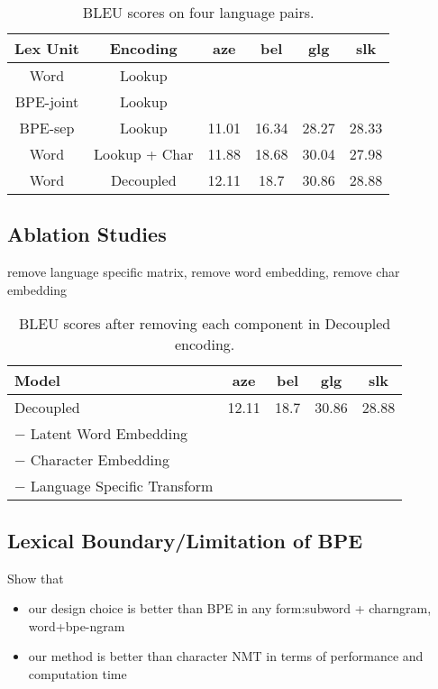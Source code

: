 \begin{table}[h]
    \centering
    \begin{tabular}{cc|cccc}
    Lex Unit & Encoding & aze & bel & glg & slk \\
    \midrule
    Word & Lookup & & & & \\
    BPE-joint & Lookup & & & & \\
    BPE-sep & Lookup & 11.01 & 16.34 & 28.27 & 28.33 \\
    \midrule
    Word & Lookup + Char & 11.88 & 18.68 & 30.04 & 27.98 \\
    Word & Decoupled & 12.11 & 18.7 & 30.86 & 28.88 \\
    \end{tabular}
    \caption{BLEU scores on four language pairs.}
    \label{tab:results}
\end{table}

\subsection{Ablation Studies}
remove language specific matrix, remove word embedding, remove char embedding
\begin{table}[h]
    \centering
    \begin{tabular}{l|cccc}
    Model & aze & bel & glg & slk \\
    \midrule
    Decoupled & 12.11 & 18.7 & 30.86 & 28.88 \\
    $-$ Latent Word Embedding &  &  &  &  \\
    $-$ Character Embedding &  &  &  &  \\
    $-$ Language Specific Transform &  &  &  &  \\
    \end{tabular}
    \caption{BLEU scores after removing each component in Decoupled encoding.}
    \label{tab:ablate}
\end{table}


\subsection{Lexical Boundary/Limitation of BPE}
Show that
\begin{itemize}
    \item our design choice is better than BPE in any form:subword + charngram, word+bpe-ngram
    \item our method is better than character NMT in terms of performance and computation time
\end{itemize}

